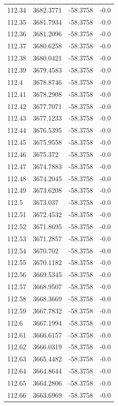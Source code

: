 \begin{table}[H]
\begin{tabular}{llll}
112.34 & 3682.3771 & -58.3758 & -0.0 \\
112.35 & 3681.7934 & -58.3758 & -0.0 \\
112.36 & 3681.2096 & -58.3758 & -0.0 \\
112.37 & 3680.6258 & -58.3758 & -0.0 \\
112.38 & 3680.0421 & -58.3758 & -0.0 \\
112.39 & 3679.4583 & -58.3758 & -0.0 \\
112.4 & 3678.8746 & -58.3758 & -0.0 \\
112.41 & 3678.2908 & -58.3758 & -0.0 \\
112.42 & 3677.7071 & -58.3758 & -0.0 \\
112.43 & 3677.1233 & -58.3758 & -0.0 \\
112.44 & 3676.5395 & -58.3758 & -0.0 \\
112.45 & 3675.9558 & -58.3758 & -0.0 \\
112.46 & 3675.372 & -58.3758 & -0.0 \\
112.47 & 3674.7883 & -58.3758 & -0.0 \\
112.48 & 3674.2045 & -58.3758 & -0.0 \\
112.49 & 3673.6208 & -58.3758 & -0.0 \\
112.5 & 3673.037 & -58.3758 & -0.0 \\
112.51 & 3672.4532 & -58.3758 & -0.0 \\
112.52 & 3671.8695 & -58.3758 & -0.0 \\
112.53 & 3671.2857 & -58.3758 & -0.0 \\
112.54 & 3670.702 & -58.3758 & -0.0 \\
112.55 & 3670.1182 & -58.3758 & -0.0 \\
112.56 & 3669.5345 & -58.3758 & -0.0 \\
112.57 & 3668.9507 & -58.3758 & -0.0 \\
112.58 & 3668.3669 & -58.3758 & -0.0 \\
112.59 & 3667.7832 & -58.3758 & -0.0 \\
112.6 & 3667.1994 & -58.3758 & -0.0 \\
112.61 & 3666.6157 & -58.3758 & -0.0 \\
112.62 & 3666.0319 & -58.3758 & -0.0 \\
112.63 & 3665.4482 & -58.3758 & -0.0 \\
112.64 & 3664.8644 & -58.3758 & -0.0 \\
112.65 & 3664.2806 & -58.3758 & -0.0 \\
112.66 & 3663.6969 & -58.3758 & -0.0 \\

\end{tabular}
\end{table}
